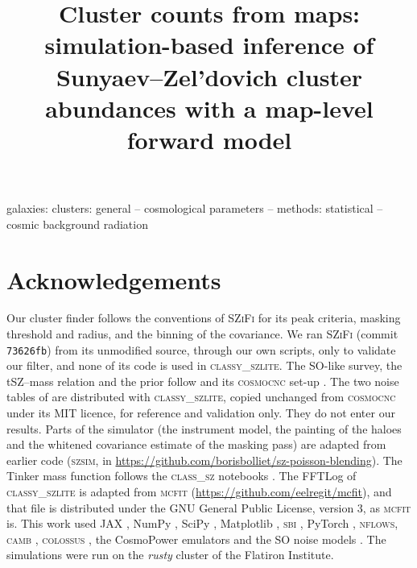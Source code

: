 \documentclass[fleqn,usenatbib]{mnras}
\title[Cluster counts from maps]{Cluster counts from maps: simulation-based inference of
Sunyaev--Zel'dovich cluster abundances with a map-level forward model}
\author[]{}
\date{}
\newcommand{\classyszlite}{\textsc{classy\_szlite}}
\begin{document}
\label{firstpage}
\pagerange{\pageref{firstpage}--\pageref{lastpage}}
\maketitle



\begin{keywords}
galaxies: clusters: general -- cosmological parameters -- methods: statistical -- cosmic background radiation
\end{keywords}









\section*{Acknowledgements}
Our cluster finder follows the conventions of \textsc{SZiFi} \citep{Zubeldia2023a,Zubeldia2023} for its
peak criteria, masking threshold and radius, and the binning of the covariance. We ran \textsc{SZiFi}
(commit \texttt{73626fb}) from its unmodified source, through our own scripts, only to validate our filter, and none of its code is used in
\classyszlite{}. The SO-like survey, the tSZ--mass relation and the prior follow \citet{Zubeldia2025} and
its \textsc{cosmocnc} set-up \citep{ZubeldiaBolliet2024}. The two noise tables of \citet{Zubeldia2025} are
distributed with \classyszlite{}, copied unchanged from \textsc{cosmocnc} under its MIT licence, for
reference and validation only. They do not enter our results. Parts of the simulator (the instrument
model, the painting of the haloes and the whitened covariance estimate of the masking pass) are adapted
from earlier code (\textsc{szsim}, in \url{https://github.com/borisbolliet/sz-poisson-blending}). The Tinker
mass function follows the \textsc{class\_sz} notebooks \citep{Bolliet2023}. The FFTLog of \classyszlite{}
\citep{Hamilton2000} is adapted from \textsc{mcfit} (\url{https://github.com/eelregit/mcfit}), and that file
is distributed under the GNU General Public License, version 3, as \textsc{mcfit} is.
This work used JAX \citep{Bradbury2018}, NumPy \citep{Harris2020}, SciPy \citep{Virtanen2020},
Matplotlib \citep{Hunter2007}, \textsc{sbi} \citep{Tejero2020}, PyTorch \citep{Paszke2019}, \textsc{nflows},
\textsc{camb} \citep{Lewis2000}, \textsc{colossus} \citep{Diemer2018}, the CosmoPower emulators
\citep{SpurioMancini2022} and the SO noise models \citep{SO2019}. The simulations were run on the
\textit{rusty} cluster of the Flatiron Institute.
\end{document}
